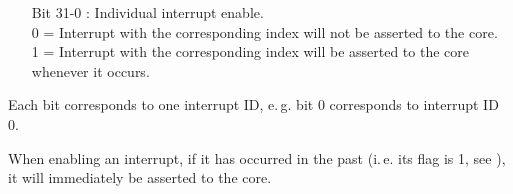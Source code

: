 \begin{itemize}[leftmargin=18mm,labelsep=3mm,parsep=1.5mm]
    \item[\footnotesize Bit 31-0] : Individual interrupt enable.\\{\footnotesize
    0 = Interrupt with the corresponding index will not be asserted to the core.\\
    1 = Interrupt with the corresponding index will be asserted to the core whenever it occurs.}
\end{itemize}
Each bit corresponds to one interrupt ID, e.\,g. bit 0 corresponds to interrupt ID 0.

When enabling an interrupt, if it has occurred in the past (i.\,e. its flag is 1, see ), it will immediately be asserted to the core.

\newpage
